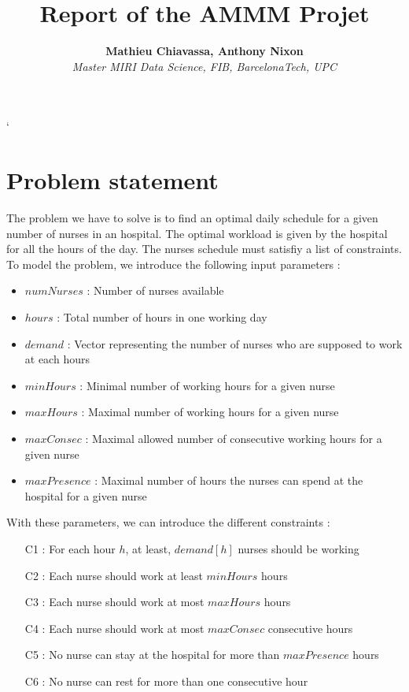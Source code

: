 \documentclass[11pt]{article}
\begin{document}
\title{Report of the AMMM Projet}
\author{{\Large \bf Mathieu Chiavassa, Anthony Nixon}\\
{\it Master MIRI Data Science,  FIB, BarcelonaTech, UPC}}

\maketitle


\tableofcontents
\pagebreak`
\section{Problem statement}
\label{sec-pbsetting}
The problem we have to solve is to find an optimal daily schedule for a given number of nurses in an hospital. The optimal workload is given by the hospital for all the hours of the day. 
The nurses schedule must satisfiy a list of constraints. \\
To model the problem, we introduce the following input parameters : 
\begin{itemize}
\item $numNurses$ : Number of nurses available 
\item $hours$ : Total number of hours in one working day
\item $demand$ : Vector representing the number of nurses who are supposed to work at each hours
\item $minHours$ : Minimal number of working hours for a given nurse
\item $maxHours$ : Maximal number of working hours for a given nurse
\item $maxConsec$ : Maximal allowed number of consecutive working hours  for a given nurse
\item $maxPresence$ : Maximal number of hours the nurses can spend at the hospital for a given nurse
\end{itemize}

\noindent
With these parameters, we  can introduce the different constraints :
\begin{itemize}
\item[C1 :] For each hour $h$, at least, $demand[h]$ nurses should be working
\item[C2 :] Each nurse should work at least $minHours$ hours 
\item[C3 :] Each nurse should work at most $maxHours$ hours 
\item[C4 :] Each nurse should work at most $maxConsec$ consecutive hours
\item[C5 :] No nurse can stay at the hospital for more than $maxPresence$ hours
\item[C6 :] No nurse can rest for more than one consecutive hour
\end{itemize}
\end{document}
